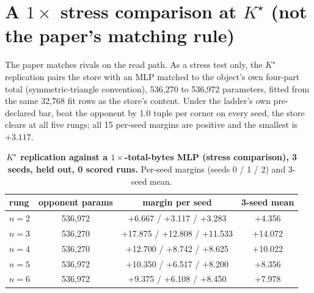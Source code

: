 \documentclass{article} %
\newcommand{\Kstar}{\ensuremath{K^{\star}}}
\begin{document}
\section{A $1\times$ stress comparison at $\Kstar$ (not the paper's matching rule)}
\label{app:1x}

The paper matches rivals on the read path. As a stress test only, the $\Kstar$ replication pairs the
store with an MLP matched to the object's own four-part total (symmetric-triangle convention),
536,270 to 536,972 parameters, fitted from the same 32,768 fit rows as the store's content.
Under the ladder's own pre-declared bar, beat the opponent by 1.0 tuple per corner on every seed,
the store clears at all five rungs; all 15 per-seed margins are positive and the smallest is
$+3.117$. %

\begin{table}[h]
\centering\small
\caption{\textbf{$\Kstar$ replication against a $1\times$-total-bytes MLP (stress comparison),
3 seeds, held out, 0 scored runs.} Per-seed margins (seeds 0 / 1 / 2) and 3-seed mean.}
\label{tab:1x}
\begin{tabular}{lccc}
\toprule
rung & opponent params & margin per seed & 3-seed mean \\
\midrule
$n=2$ & 536,972 & +6.667 / +3.117 / +3.283 & +4.356 \\
$n=3$ & 536,270 & +17.875 / +12.808 / +11.533 & +14.072 \\
$n=4$ & 536,270 & +12.700 / +8.742 / +8.625 & +10.022 \\
$n=5$ & 536,972 & +10.350 / +6.517 / +8.200 & +8.356 \\
$n=6$ & 536,972 & +9.375 / +6.108 / +8.450 & +7.978 \\
\bottomrule
\end{tabular}
\end{table}
\end{document}
